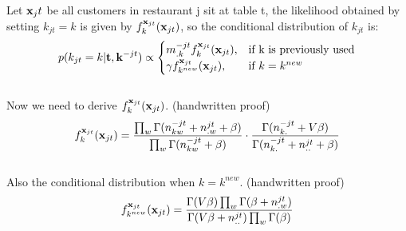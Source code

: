 \documentclass[11pt]{article}
\begin{document}
\begin{spacing}{1.6}
\noindent Let ${\bf{x}}_jt$ be all customers in restaurant j sit at table t, the likelihood obtained by setting $k_{jt}=k$ is given by $f^{{\bf{x}}_{jt}}_k({\bf{x}}_{jt})$, so the conditional distribution of $k_{jt}$ is:
\begin{equation}
p(k_{jt}=k | {\bf{t}},{\bf{k}}^{-jt}) \propto
    \begin{cases}
      m^{-jt}_{.k} f^{{\bf{x}}_{jt}}_k({\bf{x}}_{jt}), & \text{if k is previously used} \\
      \gamma f^{{\bf{x}}_{jt}}_{k^{new}}({\bf{x}}_{jt}), &\text{if}\ k=k^{new}
    \end{cases}
\end{equation}\\

\noindent Now we need to derive $f^{{\bf{x}}_{jt}}_k({\bf{x}}_{jt})$. (handwritten proof)
\begin{equation}
f^{{\bf{x}}_{jt}}_k({\bf{x}}_{jt})=\frac{\prod_w \Gamma(n^{-jt}_{kw}+n^{jt}_{.w}+\beta)}{\prod_w \Gamma(n^{-jt}_{kw}+\beta)} \cdot \frac{\Gamma(n^{-jt}_{k.}+V\beta)}{\Gamma(n^{-jt}_{k.}+n^{jt}_{..}+\beta)}
\end{equation}\\

\noindent Also the conditional distribution when $k=k^{new}$. (handwritten proof)
\begin{equation} 
f^{{\bf{x}}_{jt}}_{k^{new}}({\bf{x}}_{jt}) = \frac{\Gamma(V\beta)\prod_w \Gamma(\beta+n^{jt}_{.w})}{\Gamma(V\beta+n^{jt}_{..})\prod_w \Gamma(\beta)}
\end{equation}
\end{spacing}
\end{document}
